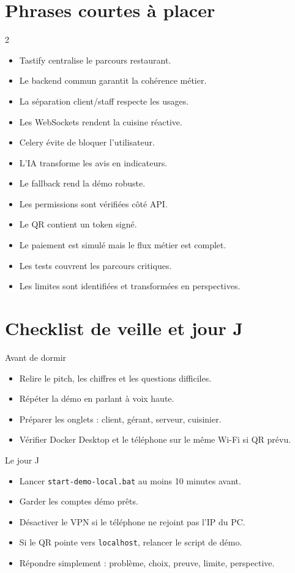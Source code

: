 \documentclass[10pt,a4paper]{article}
\newcommand{\code}[1]{\texttt{#1}}
\begin{document}
\section{Phrases courtes à placer}

\begin{multicols}{2}
\begin{itemize}
  \item Tastify centralise le parcours restaurant.
  \item Le backend commun garantit la cohérence métier.
  \item La séparation client/staff respecte les usages.
  \item Les WebSockets rendent la cuisine réactive.
  \item Celery évite de bloquer l'utilisateur.
  \item L'IA transforme les avis en indicateurs.
  \item Le fallback rend la démo robuste.
  \item Les permissions sont vérifiées côté API.
  \item Le QR contient un token signé.
  \item Le paiement est simulé mais le flux métier est complet.
  \item Les tests couvrent les parcours critiques.
  \item Les limites sont identifiées et transformées en perspectives.
\end{itemize}
\end{multicols}

\section{Checklist de veille et jour J}

\begin{alertbox}{Avant de dormir}
\begin{itemize}
  \item Relire le pitch, les chiffres et les questions difficiles.
  \item Répéter la démo en parlant à voix haute.
  \item Préparer les onglets : client, gérant, serveur, cuisinier.
  \item Vérifier Docker Desktop et le téléphone sur le même Wi-Fi si QR prévu.
\end{itemize}
\end{alertbox}

\begin{alertbox}{Le jour J}
\begin{itemize}
  \item Lancer \code{start-demo-local.bat} au moins 10 minutes avant.
  \item Garder les comptes démo prêts.
  \item Désactiver le VPN si le téléphone ne rejoint pas l'IP du PC.
  \item Si le QR pointe vers \code{localhost}, relancer le script de démo.
  \item Répondre simplement : problème, choix, preuve, limite, perspective.
\end{itemize}
\end{alertbox}
\end{document}

